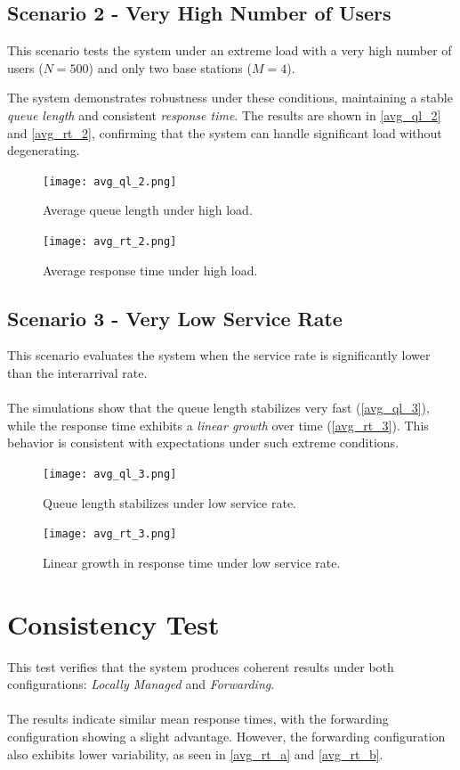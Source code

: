 \documentclass{report}
\begin{document}
\subsection{Scenario 2 - Very High Number of Users}
This scenario tests the system under an extreme load with a very high number of users ($N = 500$) and only two base stations ($M = 4$). 

The system demonstrates robustness under these conditions, maintaining a stable \textit{queue length} and consistent \textit{response time}. The results are shown in \autoref{avg_ql_2} and \autoref{avg_rt_2}, confirming that the system can handle significant load without degenerating.

\begin{figure}[H]
    \centering
    \texttt{[image: avg\_ql\_2.png]}
    \caption{Average queue length under high load.}
    \label{avg_ql_2}
\end{figure}

\begin{figure}[H]
    \centering
    \texttt{[image: avg\_rt\_2.png]}
    \caption{Average response time under high load.}
    \label{avg_rt_2}
\end{figure}

\subsection{Scenario 3 - Very Low Service Rate}
This scenario evaluates the system when the service rate is significantly lower than the interarrival rate. \\\\
The simulations show that the queue length stabilizes very fast (\autoref{avg_ql_3}), while the response time exhibits a \textit{linear growth} over time (\autoref{avg_rt_3}). This behavior is consistent with expectations under such extreme conditions.

\begin{figure}[H]
    \centering
    \texttt{[image: avg\_ql\_3.png]}
    \caption{Queue length stabilizes under low service rate.}
    \label{avg_ql_3}
\end{figure}

\begin{figure}[H]
    \centering
    \texttt{[image: avg\_rt\_3.png]}
    \caption{Linear growth in response time under low service rate.}
    \label{avg_rt_3}
\end{figure}

\section{Consistency Test}
This test verifies that the system produces coherent results under both configurations: \textit{Locally Managed} and \textit{Forwarding}. \\\\
The results indicate similar mean response times, with the forwarding configuration showing a slight advantage. However, the forwarding configuration also exhibits lower variability, as seen in \autoref{avg_rt_a} and \autoref{avg_rt_b}.
\end{document}
